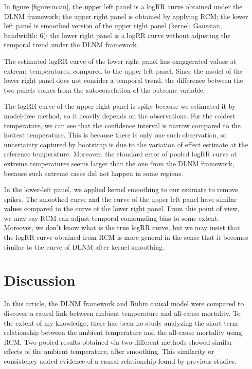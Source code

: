 \documentclass[12pt]{article}
\begin{document}
In figure \ref{figure:main},
the upper left panel is a logRR curve obtained under the DLNM framework;
the upper right panel is obtained by applying RCM;
the lower left panel is smoothed version of the upper right panel (kernel: Gaussian, bandwidth: $6$);
the lower right panel is a logRR curve without adjusting the temporal trend under the DLNM framework.

The estimated logRR curve of the lower right panel has exaggerated values at extreme temperatures,
compared to the upper left panel.
Since the model of the lower right panel does not consider a temporal trend,
the difference between the two panels comes from the autocorrelation of the outcome variable.

The logRR curve of the upper right panel is spiky
because we estimated it by model-free method, so it heavily depends on the observations.
For the coldest temperature, 
we can see that the confidence interval is narrow compared to the hottest temperature.
This is because there is only one such observation,
so uncertainty captured by bootstrap is due to the variation of effect estimate at the reference temperature.
Moreover, the standard error of pooled logRR curve at extreme temperatures
seems larger than the one from the DLNM framework,
because such extreme cases did not happen in some regions.

In the lower-left panel, we applied kernel smoothing to our estimate to remove spikes.
The smoothed curve and the curve of the upper left panel have similar values 
compared to the curve of the lower right panel.
From this point of view, 
we may say RCM can adjust temporal confounding bias to some extent.
Moreover, we don't know what is the true logRR curve,
but we may insist that the logRR curve obtained from RCM is more general
in the sense that it becomes similar to the curve of DLNM after kernel smoothing.


\section{Discussion}
\label{section:discussion}

In this article,
the DLNM framework and Rubin causal model were compared
to discover a causal link between ambient temperature and all-cause mortality.
To the extent of my knowledge, there has been no study analyzing the short-term relationship 
between the ambient temperature and the all-cause mortality using RCM.
Two pooled results obtained via two different methods
showed similar effects of the ambient temperature, after smoothing.
This similarity or consistency
added evidence of a causal relationship found by previous studies.
\end{document}
